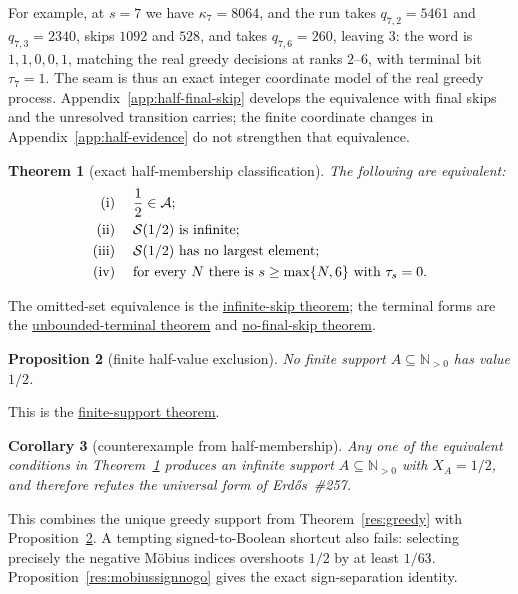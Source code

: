 \documentclass[11pt]{article}
\newcommand{\commit}{312b96c0d149ed466725c62d4ef24cfc91bca34e}
\newcommand{\repobase}{https://github.com/wcook04/plectis-lean-erdos249-257/blob/\commit}
\newcommand{\PK}{Erdos249257}
\newcommand{\lword}[4]{\href{\repobase/\PK/#1\#L#2}{#4}}
\newtheorem{theorem}{Theorem}[section]
\newtheorem{proposition}[theorem]{Proposition}
\newtheorem{corollary}[theorem]{Corollary}
\theoremstyle{definition}
\theoremstyle{remark}
\newcommand{\Npos}{\mathbb{N}_{>0}}
\begin{document}
\noindent For example, at \(s=7\) we have \(\kappa_7=8064\), and the run takes
\(q_{7,2}=5461\)
and \(q_{7,3}=2340\), skips \(1092\) and \(528\), and takes
\(q_{7,6}=260\), leaving \(3\): the word is \(1,1,0,0,1\), matching the
real greedy decisions at ranks \(2\)--\(6\), with terminal bit
\(\tau_7=1\).  The seam
is thus an exact integer coordinate model of the real greedy process.
Appendix~\ref{app:half-final-skip} develops the equivalence with
final skips and the unresolved transition carries; the finite coordinate changes in
Appendix~\ref{app:half-evidence} do not strengthen that equivalence.

\begin{theorem}[exact half-membership classification]\label{res:halfmembership}
The following are equivalent:
\[
\begin{aligned}
\textup{(i)}\;&\quad \frac12\in\mathcal A;\\
\textup{(ii)}\;&\quad \mathcal S(1/2)\ \text{is infinite};\\
\textup{(iii)}\;&\quad \mathcal S(1/2)\ \text{has no largest element};\\
\textup{(iv)}\;&\quad
  \text{for every }N\text{ there is }s\geq\max\{N,6\}
  \text{ with }\tau_s=0.
\end{aligned}
\]
\end{theorem}
\noindent The omitted-set equivalence is the
\lword{GreedyAchievementSet.lean}{2514}{half_mem_mersenneAchievementSet_iff_greedySkippedSupport_infinite}{infinite-skip theorem};
the terminal forms are the
\lword{HalfCylinderHalfMembershipClassification.lean}{126}{half_mem_mersenneAchievementSet_iff_unboundedTerminalFalse}{unbounded-terminal theorem}
and
\lword{HalfCylinderHalfMembershipClassification.lean}{235}{half_mem_mersenneAchievementSet_iff_no_lastHalfGreedySkip}{no-final-skip theorem}.

\begin{proposition}[finite half-value exclusion]\label{res:nofinitehalf}
No finite support \(A\subseteq\Npos\) has value \(1/2\).
\end{proposition}
\noindent This is the
\lword{HalfCarryReachability.lean}{589}{finite_boolSupport_ne_half}{finite-support theorem}.

\begin{corollary}[counterexample from half-membership]\label{res:halfcounterexample}
Any one of the equivalent conditions in
Theorem~\ref{res:halfmembership} produces an infinite support
\(A\subseteq\Npos\) with \(X_A=1/2\), and therefore refutes the
universal form of Erd\H{o}s~\#257.
\end{corollary}
\noindent This combines the unique greedy support from
Theorem~\ref{res:greedy} with Proposition~\ref{res:nofinitehalf}.
A tempting signed-to-Boolean shortcut also fails: selecting precisely the
negative M\"obius indices overshoots \(1/2\) by at least \(1/63\).
Proposition~\ref{res:mobiussignnogo} gives the exact sign-separation identity.
\end{document}
